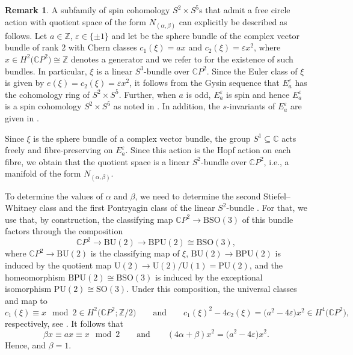 \documentclass[pdftex]{sigma}
\numberwithin{equation}{section}
\theoremstyle{definition}
\newtheorem{Remark}[Theorem]{Remark}
\numberwithin{table}{section}
\newcommand{\Z}{\mathbb{Z}}
\newcommand{\C}{\mathbb{C}}
\begin{document}
\begin{Remark}
	A subfamily of spin cohomology $S^2\times S^5$s that admit a free circle action with quotient space of the form $N_{(\alpha,\beta)}$ can explicitly be described as follows. Let $a\in\Z$, $\varepsilon\in\{\pm1\}$ and let \smash{$E_a^\varepsilon\xrightarrow{\xi}\C P^2$} be the sphere bundle of the complex vector bundle of rank $2$ with Chern classes $c_1(\xi)=a x$ and $c_2(\xi)=\varepsilon x^2$, where $x\in H^2\bigl(\C P^2\bigr)\cong\Z$ denotes a generator and we refer to \cite[Theorem A]{Th74} for the existence of such bundles. In particular, $\xi$ is a linear $S^3$-bundle over $\C P^2$. Since the Euler class of $\xi$ is given by $e(\xi)=c_2(\xi)=\varepsilon x^2$, it follows from the Gysin sequence that $E_a^\varepsilon$ has the cohomology ring of $S^2\times S^5$. Further, when $a$ is odd, $E_a^\varepsilon$ is spin and hence $E_a^\varepsilon$ is a spin cohomology $S^2\times S^5$ as noted in \cite[Section 5]{KS25}. In addition, the $s$-invariants of $E_a^\varepsilon$ are given in \cite[(5.4)]{KS25}.
	
	Since $\xi$ is the sphere bundle of a complex vector bundle, the group $S^1\subseteq\C$ acts freely and fibre-preserving on $E_a^\varepsilon$. Since this action is the Hopf action on each fibre, we obtain that the quotient space is a linear $S^2$-bundle over $\C P^2$, i.e., a manifold of the form $N_{(\alpha,\beta)}$.
	
	To determine the values of $\alpha$ and $\beta$, we need to determine the second Stiefel--Whitney class and the first Pontryagin class of the linear $S^2$-bundle \smash{$N_{(\alpha,\beta)}\to\C P^2$}. For that, we use that, by construction, the classifying map $\C P^2\to\mathrm{BSO}(3)$ of this bundle factors through the composition
	\[ \C P^2\to\mathrm{BU}(2)\to\mathrm{BPU}(2)\cong\mathrm{BSO}(3), \]
	where $\C P^2\to\mathrm{BU}(2)$ is the classifying map of $\xi$, $\mathrm{BU}(2)\to\mathrm{BPU}(2)$ is induced by the quotient map $\mathrm{U}(2)\to\mathrm{U}(2)/\mathrm{U}(1)=\mathrm{PU}(2)$, and the homeomorphism $\mathrm{BPU}(2)\cong\mathrm{BSO}(3)$ is induced by the exceptional isomorphism $\mathrm{PU}(2)\cong\mathrm{SO}(3)$. Under this composition, the universal classes \smash{$w_2\in H^2(\mathrm{BSO}(3);\Z/2)$} and  map to
	\[c_1(\xi)\equiv x\mod 2\in H^2\bigl(\C P^2;\Z/2\bigr)\qquad
\text{and}\qquad c_1(\xi)^2-4c_2(\xi)= \bigl(a^2-4\varepsilon\bigr)x^2\in H^4\bigl(\C P^2\bigr), \]
	respectively, see \cite[Lemma~3.2]{AW14}. It follows that
	\[ \beta x\equiv  ax\equiv x\mod 2 \qquad
	\text{and}\qquad  (4\alpha+\beta)x^2=\bigl(a^2-4\varepsilon\bigr)x^2. \]
	Hence,  and $\beta=1$.
\end{Remark}
\end{document}

